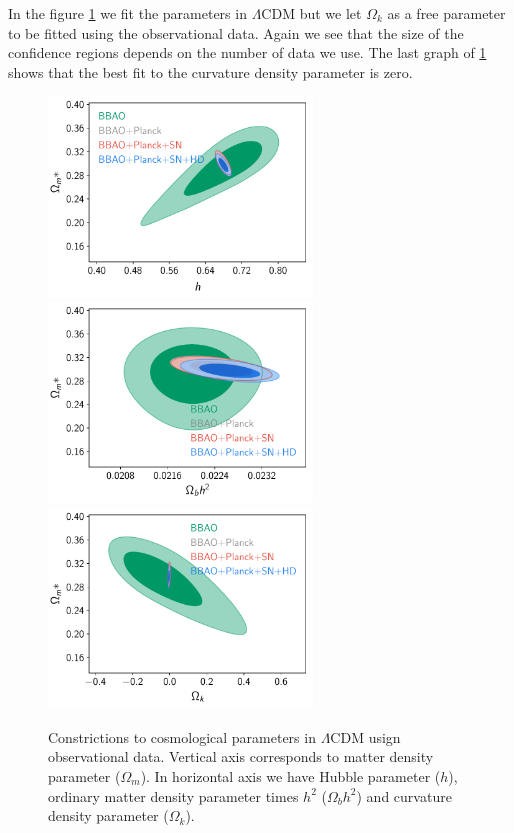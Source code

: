 \documentclass[onecolumn,           %
               showpacs,            %
               preprintnumbers,     %
               aps,                 %
               letterpaper,             %
               superscriptaddress,      %
               nofootinbib,         %
               tightenlines,        %
               floats,floatfix      %
               ,usenatbib,
               ]{revtex4-1}
\begin{document}
In the figure \ref{cLCDM} we fit the parameters in $\Lambda$CDM but we let $\Omega_k$ as a free parameter to be fitted using the observational data. Again we see that the size of the confidence regions depends on the number of data we use. The last graph of \ref{cLCDM} shows that the best fit to the curvature density parameter is zero.

\begin{figure}[htp]
	\centering
	\includegraphics[width=7cm]{FiguresCosmo/h_Om_cLCDM_todas.pdf}	
	\includegraphics[width=7cm]{FiguresCosmo/Obh2_Om_cLCDM_todas.pdf}
	\includegraphics[width=7cm]{FiguresCosmo/Ok_Om_cLCDM_todas.pdf}
	\caption{Constrictions to cosmological parameters in $\Lambda$CDM usign observational data. Vertical axis corresponds to matter density parameter ($\Omega_m$). In horizontal axis we have Hubble parameter ($h$), ordinary matter density parameter times $h^2$ ($\Omega_b h^2$) and curvature density parameter ($\Omega_k$).}
	\label{cLCDM}
\end{figure}
\end{document}
